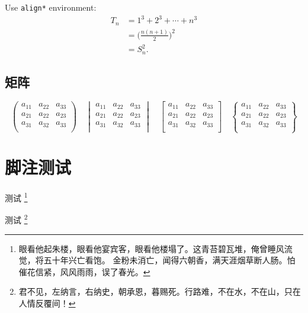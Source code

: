 \documentclass[class = professional, oneside]{gdufe_master_thesis}
\begin{document}
Use \texttt{align*} environment:
\begin{align*}
    T_n & = 1^3 + 2^3 + \cdots + n^3         \\
        & = \biggl(\frac{n(n+1)}{2}\biggr)^2 \\
        & = S_n^2.
\end{align*}

\subsection{矩阵}

\[\begin{pmatrix}
        a_{11} & a_{22} & a_{33} \\
        a_{21} & a_{22} & a_{23} \\
        a_{31} & a_{32} & a_{33} \\
    \end{pmatrix} \quad
    \begin{vmatrix}
        a_{11} & a_{22} & a_{33} \\
        a_{21} & a_{22} & a_{23} \\
        a_{31} & a_{32} & a_{33} \\
    \end{vmatrix} \quad
    \begin{bmatrix}
        a_{11} & a_{22} & a_{33} \\
        a_{21} & a_{22} & a_{23} \\
        a_{31} & a_{32} & a_{33} \\
    \end{bmatrix} \quad
    \begin{Bmatrix}
        a_{11} & a_{22} & a_{33} \\
        a_{21} & a_{22} & a_{23} \\
        a_{31} & a_{32} & a_{33} \\
    \end{Bmatrix}\]

\section{脚注测试}

测试 \footnote{眼看他起朱楼，眼看他宴宾客，眼看他楼塌了。这青苔碧瓦堆，俺曾睡风流觉，将五十年兴亡看饱。
    金粉未消亡，闻得六朝香，满天涯烟草断人肠。怕催花信紧，风风雨雨，误了春光。}

测试 \footnote[3]{君不见，左纳言，右纳史，朝承恩，暮赐死。行路难，不在水，不在山，只在人情反覆间！}
\end{document}
